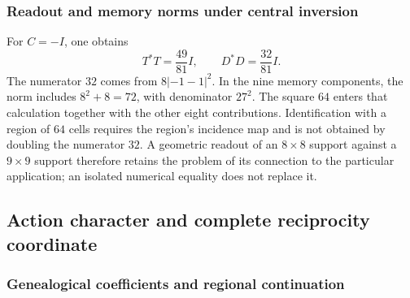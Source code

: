\subsubsection{Readout and memory norms under central inversion}
\label{md:restop:treinta-y-dos}

For $C=-I$, one obtains
\begin{equation}
 T^*T=\frac{49}{81}I,\qquad
 D^*D=\frac{32}{81}I.
 \label{md:restop:normas}
\end{equation}
The numerator $32$ comes from $8|{-1}-1|^2$.
In the nine memory components, the norm includes
$8^2+8=72$, with denominator $27^2$. The square $64$ enters
that calculation together with the other eight contributions.
Identification with a region of $64$ cells requires the region's
incidence map and is not obtained by doubling the numerator $32$.
A geometric readout of an $8\times8$ support against a
$9\times9$ support therefore retains the problem of its connection to the
particular application; an isolated numerical equality does not replace it.

\subsection{Action character and complete reciprocity coordinate}
\label{md:restop:h5}

\subsubsection{Genealogical coefficients and regional continuation}
\label{md:restop:coeficientes}

